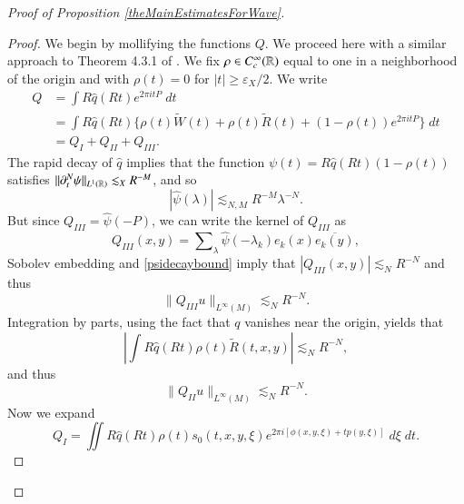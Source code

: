 \begin{proof}[Proof of Proposition \ref{theMainEstimatesForWave}]
\begin{proof}
    We begin by mollifying the functions $Q$. We proceed here with a similar approach to Theorem 4.3.1 of \cite{Sogge}. We fix $\rho \in C_c^\infty(\operatorname{\mathbb{R}})$ equal to one in a neighborhood of the origin and with $\rho(t) = 0$ for $|t| \geq \varepsilon_X / 2$. We write
    \begin{equation}
    \begin{split}
        Q &= \int R \widehat{q}(R t) e^{2 \pi i t P}\; dt\\
        &= \int R \widehat{q}(Rt) \Big\{ \rho(t) \tilde{W}(t) + \rho(t) \tilde{R}(t) + (1 - \rho(t)) e^{2 \pi i t P} \Big\}\; dt\\
        &= Q_I + Q_{II} + Q_{III}.
    \end{split}
    \end{equation}
    The rapid decay of $\widehat{q}$ implies that the function $\psi(t) = R \widehat{q}(Rt) (1 - \rho(t))$ satisfies $\| \partial_t^N \psi \|_{L^1(\operatorname{\mathbb{R}})} \lesssim_X R^{-M}$, and so
    \begin{equation} \label{psidecaybound}
        |\widehat{\psi}(\lambda)| \lesssim_{N,M} R^{-M} \lambda^{-N}.
    \end{equation}
    But since $Q_{III} = \widehat{\psi}(-P)$, we can write the kernel of $Q_{III}$ as
    \begin{equation}
        Q_{III}(x,y) = \sum\nolimits_\lambda \widehat{\psi}(-\lambda_k) e_k(x) \overline{e_k(y)},
    \end{equation}
    Sobolev embedding and \eqref{psidecaybound} imply that $|Q_{III}(x,y)| \lesssim_N R^{-N}$ and thus
    \begin{equation} \label{QThreeBound}
        \| Q_{III} u \|_{L^\infty(M)} \lesssim_N R^{-N}.
    \end{equation}
    Integration by parts, using the fact that $q$ vanishes near the origin, yields that
    \begin{equation}
        \left| \int R \widehat{q}(Rt) \rho(t) \tilde{R}(t,x,y) \right| \lesssim_N R^{-N},
    \end{equation}
    and thus
    \begin{equation} \label{QTwoBound}
        \| Q_{II} u \|_{L^\infty(M)} \lesssim_N R^{-N}.
    \end{equation}
    Now we expand
    \begin{equation}
        Q_I = \iint R \widehat{q}(Rt) \rho(t) s_0(t,x,y,\xi) e^{2 \pi i [ \phi(x,y,\xi) + t p(y,\xi) ]}\; d\xi\; dt.
    \end{equation}

\end{proof}
\end{proof}

